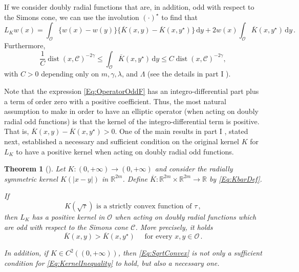 \documentclass[12pt,reqno]{amsart}
\newtheorem{theorem}{Theorem}[section]
\theoremstyle{definition}
\theoremstyle{remark}
\newcommand{\con}[1]{\mathbb{#1}}
\newcommand{\R}{\con{R}} %
\newcommand{\ccal}{\mathscr{C}}
\newcommand{\ocal}{\mathcal{O}}
\newcommand{\s}{\gamma}
\renewcommand{\d}{\,\mathrm{d}} %
\DeclareMathOperator{\dist}{dist}
\numberwithin{equation}{section}
\begin{document}
If we consider doubly radial functions that are, in addition, odd with respect to the Simons cone, we can use the involution $(\cdot)^\star$ to find that
\begin{equation}
\label{Eq:OperatorOddF}
L_K w (x) = \int_{\ocal} \{w(x) - w(y) \} \{\overline{K}(x, y) - \overline{K}(x, y^\star)  \} \d y +  2 w(x) \int_{\ocal} \overline{K}(x, y^\star) \d y \,.
\end{equation}
Furthermore,
\begin{equation}
\label{Eq:ZeroOrderTerm}
\frac{1}{C} \dist(x,\ccal)^{-2\s} \leq \int_{\ocal} \overline{K}(x, y^\star) \d y \leq C \dist(x,\ccal)^{-2\s},
\end{equation}
with $C>0$ depending only on $m, \s, \lambda$, and $\Lambda$ (see the details in part I \cite{FelipeSanz-Perela:IntegroDifferentialI}).


Note that the expression \eqref{Eq:OperatorOddF} has an integro-differential part plus a term of order zero with a positive coefficient. Thus, the most natural assumption to make in order to have an elliptic operator (when acting on doubly radial odd functions) is that the kernel of the integro-differential term is positive. That is, $\overline{K}(x, y) - \overline{K}(x, y^\star)>0$. One of the main results in part I \cite{FelipeSanz-Perela:IntegroDifferentialI}, stated next, established a necessary and sufficient condition on the original kernel $K$ for $L_K$ to have a positive kernel when acting on doubly radial odd functions. 

\begin{theorem}[\cite{FelipeSanz-Perela:IntegroDifferentialI}]
	\label{Th:SufficientNecessaryConditions}
	Let $K:(0,+\infty) \to (0,+\infty)$ and consider the radially symmetric kernel $K(|x-y|)$ in $\R^{2m}$. Define $\overline{K} : \R^{2m}\times \R^{2m} \to \R$ by \eqref{Eq:KbarDef}.
	
	If 
	\begin{equation}
	\label{Eq:SqrtConvex}	
	K(\sqrt{\tau}) \text{ is a strictly convex function of }\tau\,,
	\end{equation}
	then $L_K$ has a positive kernel in $\ocal$ when acting on doubly radial functions which are odd with respect to the Simons cone $\ccal$. More precisely, it holds
	\begin{equation}
	\label{Eq:KernelInequality}
	\overline{K}(x,y) > \overline{K}(x, y^\star) \quad \text{ for every }x,y \in \ocal\,.
	\end{equation}
	
	In addition, if $K\in C^2((0,+\infty))$, then \eqref{Eq:SqrtConvex} is not only a sufficient condition for \eqref{Eq:KernelInequality} to hold, but also a necessary one.
\end{theorem}
\end{document}
